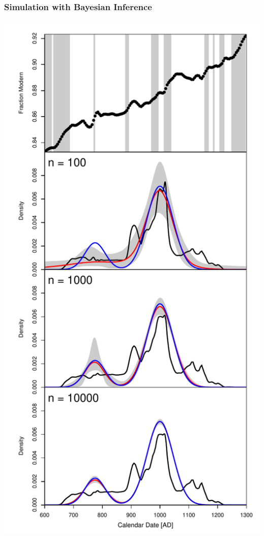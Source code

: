 \documentclass{beamer}
\begin{document}
\begin{frame}[t]
  \frametitle{Simulation with Bayesian Inference}
    \includegraphics[height=.85\textheight]{Fig1_sim_inference.pdf}
\end{frame}
\end{document}
